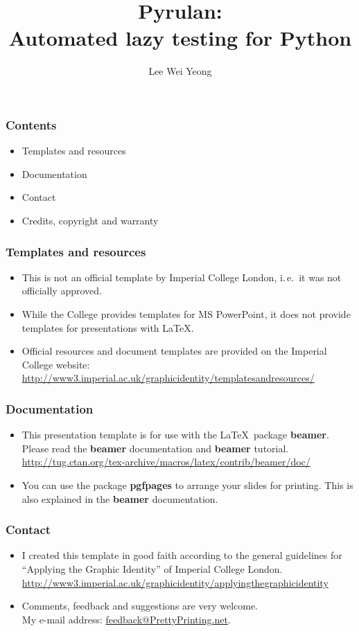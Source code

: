 \documentclass[t]{beamer}
\author{Lee Wei Yeong}
\title[lwy08@doc.ic.ac.uk]{Pyrulan:\\Automated lazy testing for Python}
\begin{document}
\frame{\maketitle}

\begin{frame}
\frametitle{Contents}
	\begin{itemize}
	\item Templates and resources
	\item Documentation
	\item Contact
	\item Credits, copyright and warranty
	\end{itemize}
\end{frame}

\begin{frame}
\frametitle{Templates and resources}
	\begin{itemize}
	\item This is not an official template by Imperial 
	College London,
	i.\,e.\ it was not officially approved.
	\item While the College provides templates for 
	MS PowerPoint, it does not provide templates 
	for presentations with \LaTeX. 
	\item Official resources and document 
	templates are provided on the Imperial 
	College website:\\	
	\url{
http://www3.imperial.ac.uk/graphicidentity/templatesandresources/ }
	\end{itemize}
\end{frame}

\begin{frame}
\frametitle{Documentation}
	\begin{itemize}
	\item This presentation template is for use 
	with the \LaTeX\ package \textbf{beamer}.
	Please read the \textbf{beamer} documentation 
	and  \textbf{beamer} tutorial.\\	
\url{
http://tug.ctan.org/tex-archive/macros/latex/contrib/beamer/doc/}
	\item You can use the package \textbf{pgfpages} 
	to arrange your slides for printing. This is also explained
	in the \textbf{beamer} documentation.
	\end{itemize}
\end{frame}

\begin{frame}
\frametitle{Contact}
	\begin{itemize}
	\item I created this template in good faith according
	to the general guidelines for ``Applying the Graphic
	Identity'' of Imperial College London.\\	
\url{
http://www3.imperial.ac.uk/graphicidentity/applyingthegraphicidentity}
	\item Comments, feedback and suggestions are very welcome.\\
	My e-mail address:
	\href{mailto:feedback@prettyprinting.net}{feedback@PrettyPrinting.net}.
	\end{itemize}
\end{frame} 
\end{document}
